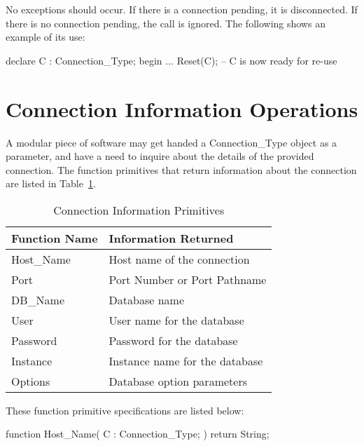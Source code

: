 \documentclass[english,letterpaper]{book}
\begin{document}
No exceptions should occur. If there is a connection pending, it is
disconnected. If there is no connection pending, the call is ignored.
The following shows an example of its use:

\begin{Example}
declare
   C : Connection_Type;
begin
   ...
   Reset(C);  -- C is now ready for re-use
\end{Example}

\section{Connection Information Operations}

A modular piece of software may get handed a Connection\_Type object
as a parameter, and have a need to inquire about the details of the
provided connection. The function primitives that return information
about the connection are listed in Table~\ref{t:cinfp}.

\begin{table}
   \begin{center}
      \begin{tabular}{ll}
         Function Name     &  Information Returned\\
         \hline 
         Host\_Name        &  Host name of the connection\\
         Port              &  Port Number or Port Pathname\\
         DB\_Name          &  Database name\\
         User              &  User name for the database\\
         Password          &  Password for the database\\
         Instance          &  Instance name for the database\\
         Options           &  Database option parameters\\
      \end{tabular}
   \end{center}
   \caption{Connection Information Primitives}\label{t:cinfp}
\end{table}

These function primitive specifications are listed below:

\begin{Code}
function Host_Name(
   C : Connection_Type;
) return String;
\end{Code}
\end{document}
